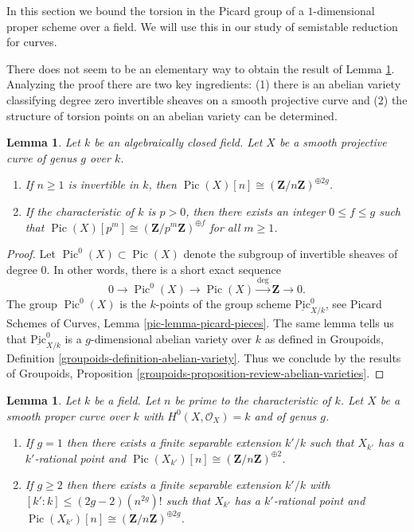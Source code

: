 \documentclass{stacks-project}
\theoremstyle{plain}
\newtheorem{lemma}[subsection]{Lemma}
\theoremstyle{definition}
\theoremstyle{remark}
\numberwithin{equation}{subsection}
\def\Pic{\mathop{\mathrm{Pic}}\nolimits}
\def\Picardfunctor{\mathrm{Pic}}
\begin{document}
\noindent
In this section we bound the torsion in the Picard group of a $1$-dimensional
proper scheme over a field. We will use this in our
study of semistable reduction for curves.

\medskip\noindent
There does not seem to be an elementary way to obtain the result of
Lemma \ref{lemma-torsion-picard-smooth-projective}.
Analyzing the proof there are two key ingredients:
(1) there is an abelian variety classifying degree zero invertible sheaves on
a smooth projective curve and (2) the structure of torsion points on
an abelian variety can be determined.

\begin{lemma}
\label{lemma-torsion-picard-smooth-projective}
Let $k$ be an algebraically closed field.
Let $X$ be a smooth projective curve of genus $g$ over $k$.
\begin{enumerate}
\item If $n \geq 1$ is invertible in $k$, then
$\Pic(X)[n] \cong (\mathbf{Z}/n\mathbf{Z})^{\oplus 2g}$.
\item If the characteristic of $k$ is $p > 0$, then there exists
an integer $0 \leq f \leq g$ such that
$\Pic(X)[p^m] \cong (\mathbf{Z}/p^m\mathbf{Z})^{\oplus f}$ for
all $m \geq 1$.
\end{enumerate}
\end{lemma}

\begin{proof}
Let $\Pic^0(X) \subset \Pic(X)$
denote the subgroup of invertible sheaves of degree $0$.
In other words, there is a short exact sequence
$$
0 \to \Pic^0(X) \to \Pic(X) \xrightarrow{\deg} \mathbf{Z} \to 0.
$$
The group $\Pic^0(X)$ is the $k$-points of
the group scheme $\underline{\Picardfunctor}^0_{X/k}$, see
Picard Schemes of Curves, Lemma \ref{pic-lemma-picard-pieces}.
The same lemma tells us that $\underline{\Picardfunctor}^0_{X/k}$
is a $g$-dimensional abelian variety over $k$ as defined in
Groupoids, Definition \ref{groupoids-definition-abelian-variety}.
Thus we conclude by the results of
Groupoids, Proposition \ref{groupoids-proposition-review-abelian-varieties}.
\end{proof}

\begin{lemma}
\label{lemma-torsion-picard-becomes-visible}
Let $k$ be a field. Let $n$ be prime to the characteristic of $k$.
Let $X$ be a smooth proper curve over $k$ with $H^0(X, \mathcal{O}_X) = k$
and of genus $g$.
\begin{enumerate}
\item If $g = 1$ then there exists a finite separable extension
$k'/k$ such that $X_{k'}$ has a $k'$-rational point and
$\Pic(X_{k'})[n] \cong (\mathbf{Z}/n\mathbf{Z})^{\oplus 2}$.
\item If $g \geq 2$ then there exists a finite separable extension
$k'/k$ with $[k' : k] \leq (2g - 2)(n^{2g})!$
such that $X_{k'}$ has a $k'$-rational point and
$\Pic(X_{k'})[n] \cong (\mathbf{Z}/n\mathbf{Z})^{\oplus 2g}$.
\end{enumerate}
\end{lemma}
\end{document}
